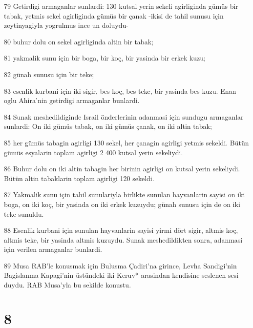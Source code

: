 \par 79 Getirdigi armaganlar sunlardi: 130 kutsal yerin sekeli agirliginda gümüs bir tabak, yetmis sekel agirliginda gümüs bir çanak -ikisi de tahil sunusu için zeytinyagiyla yogrulmus ince un doluydu-
\par 80 buhur dolu on sekel agirliginda altin bir tabak;
\par 81 yakmalik sunu için bir boga, bir koç, bir yasinda bir erkek kuzu;
\par 82 günah sunusu için bir teke;
\par 83 esenlik kurbani için iki sigir, bes koç, bes teke, bir yasinda bes kuzu. Enan oglu Ahira'nin getirdigi armaganlar bunlardi.
\par 84 Sunak meshedildiginde Israil önderlerinin adanmasi için sundugu armaganlar sunlardi: On iki gümüs tabak, on iki gümüs çanak, on iki altin tabak;
\par 85 her gümüs tabagin agirligi 130 sekel, her çanagin agirligi yetmis sekeldi. Bütün gümüs esyalarin toplam agirligi 2 400 kutsal yerin sekeliydi.
\par 86 Buhur dolu on iki altin tabagin her birinin agirligi on kutsal yerin sekeliydi. Bütün altin tabaklarin toplam agirligi 120 sekeldi.
\par 87 Yakmalik sunu için tahil sunulariyla birlikte sunulan hayvanlarin sayisi on iki boga, on iki koç, bir yasinda on iki erkek kuzuydu; günah sunusu için de on iki teke sunuldu.
\par 88 Esenlik kurbani için sunulan hayvanlarin sayisi yirmi dört sigir, altmis koç, altmis teke, bir yasinda altmis kuzuydu. Sunak meshedildikten sonra, adanmasi için verilen armaganlar bunlardi.
\par 89 Musa RAB'le konusmak için Bulusma Çadiri'na girince, Levha Sandigi'nin Bagislanma Kapagi'nin üstündeki iki Keruv* arasindan kendisine seslenen sesi duydu. RAB Musa'yla bu sekilde konustu.

\chapter{8}

